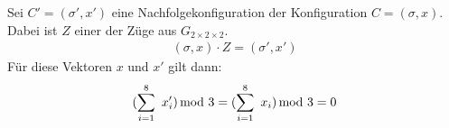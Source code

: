 \documentclass[12pt,a4paper, usenames, dvipsnames]{article}
\theoremstyle{mystyle}
\theoremstyle{definition}
\newcommand{\Gtwo}{\ensuremath{G_{2\times 2\times 2}}}
\begin{document}
Sei $C'=(\sigma', x')$ eine Nachfolgekonfiguration der Konfiguration $C=(\sigma, x)$.  Dabei ist $Z$ einer der Züge aus $\Gtwo$.  
\begin{align*}
{(\sigma, x) \cdot Z = (\sigma', x')}
\end{align*}
Für diese Vektoren $x$ und $x'$ gilt dann:
\begin{align*}
(\sum_{i= 1}^{8} \ x_i') \hspace*{-0.5em} \mod 3 = (\sum_{i= 1}^{8} \  x_i) \hspace*{-0.5em} \mod 3 = 0
\end{align*}



%
%
%
%
%
%
%
%
%
%
\end{document}
